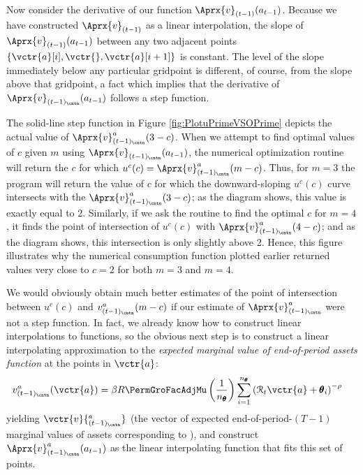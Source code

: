 \documentclass[titlepage, headings=optiontotocandhead]{Resources/texmf-local/tex/latex/econtex}
\begin{document}
Now consider the derivative of our function $\Aprx{v}_{({t-1})}(a_{t-1})$.  Because we have
constructed $\Aprx{v}_{({t-1})}$ as a linear interpolation, the slope of
$\Aprx{v}_{({t-1})}(a_{t-1})$ between any two adjacent points
$\{\vctr{a}[i],\vctr{},\vctr{a}[{i+1}]\}$ is constant.  The level of the slope immediately below any
particular gridpoint is different, of course, from the slope above that gridpoint, a fact which
implies that the derivative of $\Aprx{v}_{({t-1})_\cntn}(a_{t-1})$ follows a step function.

The solid-line step function in Figure \ref{fig:PlotuPrimeVSOPrime} depicts the actual value of
$\Aprx{v}_{({t-1})_\cntn}^{a}(3-c)$.  When we attempt to find optimal values of
$c$ given $m$ using $\Aprx{v}_{({t-1})_\cntn}(a_{t-1})$, the numerical optimization routine will
return the $c$ for which
$u^{c}(c) = \Aprx{v}^{a}_{({t-1})_\cntn}(m-c)$.  Thus, for
$m=3$ the program will return the value of $c$ for which the downward-sloping
$u^{c}(c)$ curve intersects with the
$\Aprx{v}_{({t-1})_\cntn}^{a}(3-c)$; as the diagram shows, this value is exactly equal to 2.
Similarly, if we ask the routine to find the optimal $c$ for $m=4$, it finds the point of
intersection of $u^{c}(c)$ with $\Aprx{v}_{({t-1})_\cntn}^{a}(4-c)$; and as the diagram shows, this
intersection is only slightly above 2.  Hence, this figure illustrates why the numerical consumption
function plotted earlier returned values very close to $c=2$ for both $m=3$ and $m=4$.

We would obviously obtain much better estimates of the point of intersection between $u^{c}(c)$ and $v_{({t-1})_\cntn}^{a}(m-c)$ if our estimate of $\Aprx{v}^{a}_{({t-1})_\cntn}$ were not a step function.  In fact, we already know how to construct linear interpolations to functions, so the obvious next step is to construct a linear interpolating approximation to the \textit{expected marginal value of end-of-period assets function} at the points in $\vctr{a}$:
\begin{equation}\begin{gathered}\begin{aligned}
      v_{({t-1})_\cntn}^{a}(\vctr{a})  & =  \beta R \PermGroFacAdjMu \left(\frac{1}{n_{\pmb{\theta}}}\right) \sum_{i=1}^{n_{\pmb{\theta}}} \left(\mathcal{R}_{t} \vctr{a} + \pmb{\theta}_{i}\right)^{-\rho} \label{eq:vEndPrimeTm1}
    \end{aligned}\end{gathered}\end{equation}
yielding $\vctr{v}{^{a}_{({t-1})_\cntn}}$ (the vector of expected end-of-period-$(T-1)$ marginal values of assets corresponding to ),  %
and construct
$\Aprx{v}_{({t-1})_\cntn}^{a}(a_{t-1})$ as the linear
interpolating function that fits this set of points.
\end{document}
